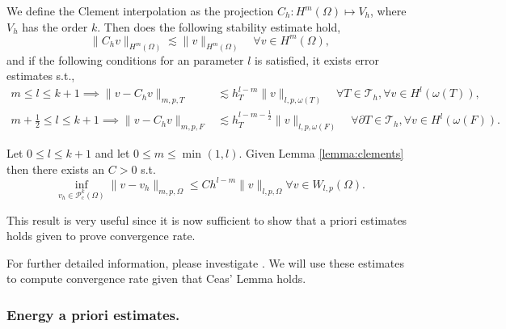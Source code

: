 \begin{lemma}
    \label{lemma:clements}

We define the Clement interpolation as the projection
$C_{h}: H^{m} \left( \Omega  \right) \mapsto V_{h}$, where $V_{h}$ has the order $k$. Then does the following stability estimate hold,
\[
 \| C_{h} v \|_{H^{m}\left( \Omega  \right)   }^{  } \lesssim \| v \|_{ H^{m}\left( \Omega  \right)  }^{  } \quad \forall v \in H^{m}\left( \Omega  \right),
\]
and if the following conditions for an parameter $l$ is satisfied, it exists error estimates s.t.,
\[
    \begin{split}
      m\le l \le k+1  \implies \| v - C_{h} v \|_{ m,p,T   }^{  }  &  \lesssim h^{l-m}_{T} \| v \|_{l,p,\omega \left( T \right)  }^{  } \quad  \forall T \in \mathcal{T} _{h}, \forall v \in H^{l}( \omega \left( T \right)
      ), \\
      m +\frac{1}{2}\le l \le k+1  \implies \| v - C_{h} v \|_{ m,p,F }^{  } & \lesssim h^{l-m- \frac{1}{2}}_{T} \| v \|_{l,p,\omega \left( F \right)  }^{  } \quad  \forall \partial T \in \mathcal{T} _{h}, \forall v \in H^{l}( \omega \left( F
      \right)).
    \end{split}
\]

\end{lemma}


\begin{corollary}
    \label{cor:celement_apriori}
    Let $0 \le l \le k+1$ and let $0\le m \le \min_{} ( 1,l )$.
    Given Lemma \ref{lemma:clements}  then there exists an $C > 0$ s.t.
    \[
    \inf_{v_{h} \in \mathcal{P} ^{k}_{c}( \Omega ) } \| v - v_{h} \|_{  m,p,\Omega }^{  } \le C h^{l-m}  \| v \|_{ l,p,\Omega  }^{  }    \forall v \in W_{l,p}( \Omega ).
    \]
\end{corollary}


This result is very useful since it is now sufficient to show that a priori estimates holds given to prove convergence rate.

For further detailed information, please investigate \cite[Chapter 1.6]{ern04}.
We will use these estimates to compute convergence rate given that Ceas' Lemma holds.


\subsubsection{Energy a priori estimates.  }%
\label{ssub:extension}

